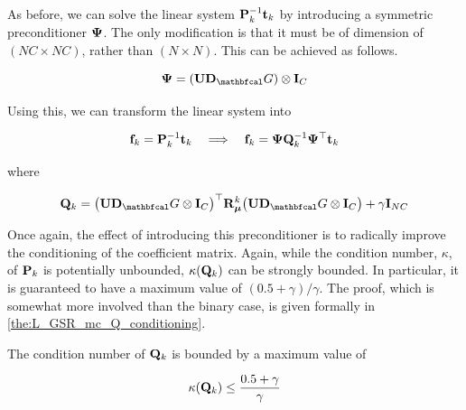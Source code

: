 As before, we can solve the linear system $\mathbf{P}^{-1}_k \mathbf{t}_k$ by introducing a symmetric preconditioner $\mathbf{\Psi}$. The only modification is that it must be of dimension of $(NC \times NC)$, rather than $(N \times N)$. This can be achieved as follows. 

\begin{equation*}
    \PSI = \left(\U \D_\Gt\right) \otimes \I_C 
\end{equation*}

Using this, we can transform the linear system into 

\begin{equation*}
    \mathbf{f}_k = \mathbf{P}^{-1}_k \mathbf{t}_k \quad \Longrightarrow \quad \mathbf{f}_k = \mathbf{\Psi} \mathbf{Q}_k^{-1} \mathbf{\Psi}^\top \mathbf{t}_k
\end{equation*}

where 

\begin{equation}
    \label{eq:Q_LGSR_mc}
    \Q_k = \big(\U \D_\Gt \otimes \I_C\big)^\top  \RR_{\muu}^k \big(\U \D_\Gt \otimes \I_C\big) + \gamma \I_{NC}
\end{equation}

Once again, the effect of introducing this preconditioner is to radically improve the conditioning of the coefficient matrix. Again, while the condition number, $\kappa$, of $\mathbf{P}_k$ is potentially unbounded, $\kappa(\mathbf{Q}_k)$ can be strongly bounded. In particular, it is guaranteed to have a maximum value of $(0.5 + \gamma) / \gamma$. The proof, which is somewhat more involved than the binary case, is given formally in \cref{the:L_GSR_mc_Q_conditioning}. 

\begin{theorem}
    \label{the:L_GSR_mc_Q_conditioning}
    
    The condition number of $\mathbf{Q}_k$ is bounded by a maximum value of 
    
    \begin{equation}
        \kappa(\mathbf{Q}_k) \leq \frac{0.5 + \gamma}{\gamma}
    \end{equation}

\end{theorem}

